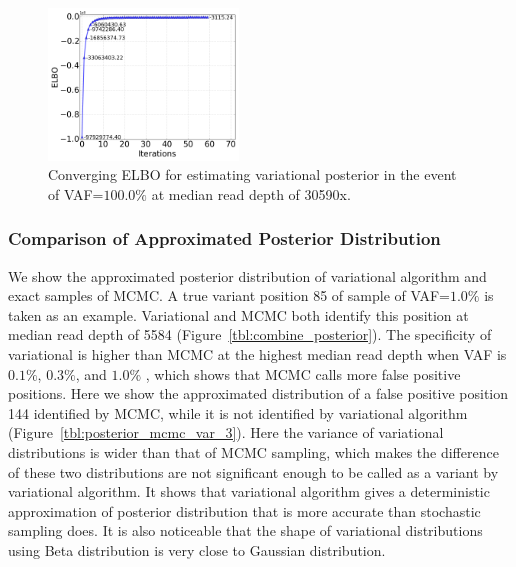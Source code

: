 \documentclass{article}
\begin{document}
\begin{figure}[h]
\centering
\vspace{-5pt}
\includegraphics[width=0.45\textwidth]{figs/converge_ELBO.png}
\caption{Converging ELBO for estimating variational posterior in the event of VAF=$100.0\%$ at median read depth of 30590x.}
\vspace{-10pt}
\label{tbl:converge_ELBO.png}
\end{figure}


\subsubsection{Comparison of Approximated Posterior Distribution}
We show the approximated posterior distribution of variational algorithm and exact samples of MCMC.
A true variant position 85 of sample of VAF=$1.0\%$ is taken as an example.
Variational and MCMC both identify this position at median read depth of 5584 (Figure~\ref{tbl:combine_posterior}).
The specificity of variational is higher than MCMC at the highest median read depth when VAF is $0.1\%$, $0.3\%$, and $1.0\%$ , which shows that MCMC calls more false positive positions.
Here we show the approximated distribution of a false positive position 144 identified by MCMC, while it is not identified by variational algorithm (Figure~\ref{tbl:posterior_mcmc_var_3}).
Here the variance of variational distributions is wider than that of MCMC sampling, which makes the difference of these two distributions are not significant enough to be called as a variant by variational algorithm. 
It shows that variational algorithm gives a deterministic approximation of posterior distribution that is more accurate than stochastic sampling does.
It is also noticeable that the shape of variational distributions using Beta distribution is very close to Gaussian distribution.
\end{document}
